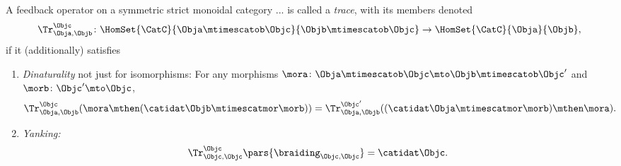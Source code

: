 \begin{ctdefinition}
\label{def:trace-operator}
A feedback operator on a symmetric strict monoidal category ... is called a \emph{trace}, with its members denoted
\begin{equation}
        \Tr_{\Obja,\Objb}^\Objc\colon \HomSet{\CatC}{\Obja \mtimescatob \Objc}{\Objb\mtimescatob \Objc}\to \HomSet{\CatC}{\Obja}{\Objb},
    \end{equation}
if it (additionally) satisfies 
\begin{enumerate}
\item \emph{Dinaturality} not just for isomorphisms: For any morphisms $\mora \colon \Obja  \mtimescatob \Objc \mto \Objb \mtimescatob \Objc'$ and $\morb \colon \Objc' \mto \Objc$,
              \begin{equation}\label{eq:trace-dinaturality}
                  \Tr_{\Obja, \Objb}^{\Objc} (\mora \mthen (\catidat\Objb \mtimescatmor \morb)) = \Tr_{\Obja, \Objb}^{\Objc'}((\catidat\Obja \mtimescatmor \morb) \mthen \mora).
              \end{equation}
\item \emph{Yanking:}
              \begin{equation}
                  \label{eq:yanking}
                  \Tr_{\Objc,\Objc}^\Objc\pars{\braiding_{\Objc,\Objc}}=\catidat\Objc.
              \end{equation}
\end{enumerate}

\end{ctdefinition}



